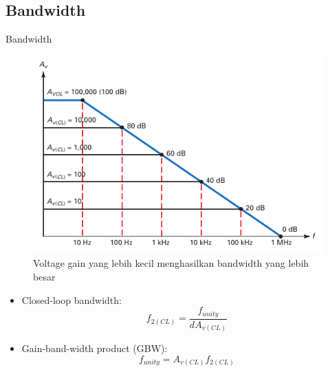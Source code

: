 \subsection{Bandwidth}
\begin{frame}{Bandwidth}
	\begin{multicols}{2}
		\begin{figure}
			\centering
			\includegraphics[height=0.6\textheight]{gambar/fig-16.15}
			\caption{Voltage gain yang lebih kecil menghasilkan bandwidth yang lebih besar}
			\label{fig-16.15}
		\end{figure}
	\columnbreak
		\begin{itemize}
			\item Closed-loop bandwidth:
			\begin{equation}\label{pers.16.5}
				f_{2(CL)} = \frac{f_{unity}}{dA_{v(CL)}}
			\end{equation}
			\item Gain-band-width product (GBW):
			\begin{equation}\label{pers.16.6}
				f_{unity} = A_{v(CL)}f_{2(CL)}
			\end{equation}
		\end{itemize}
	\end{multicols}
\end{frame}

